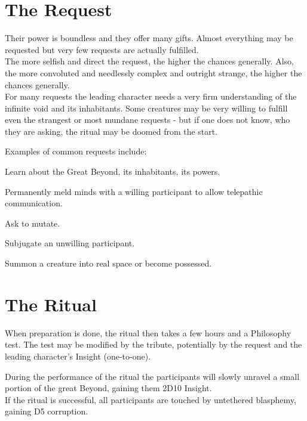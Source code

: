 \documentclass[12pt,a4paper,openany]{book}
\begin{document}
	\section{The Request}
	Their power is boundless and they offer many gifts. Almost everything may be requested but very few requests are actually fulfilled.
	\\
	The more selfish and direct the request, the higher the chances generally.
	Also, the more convoluted and needlessly complex and outright strange, the higher the chances generally.
	\\
	For many requests the leading character needs a very firm understanding of the infinite void and its inhabitants. 
	Some creatures may be very willing to fulfill even the strangest or most mundane requests
		- but if one does not know, who they are asking,
		the ritual may be doomed from the start.
	\par
	Examples of common requests include:
	\begin{sitemize}
		\item Learn about the Great Beyond, its inhabitants, its powers.
		\item Permanently meld minds with a willing participant to allow telepathic communication.
		\item Ask to mutate.
		\item Subjugate an unwilling participant.
		\item Summon a creature into real space or become possessed.
	\end{sitemize}
	\section{The Ritual}
	When preparation is done, the ritual then takes a few hours and a Philosophy test. The test may be modified by the tribute, potentially by the request and the leading character's Insight (one-to-one).
	\par
	During the performance of the ritual the participants will slowly unravel a small portion of the great Beyond, gaining them 2D10 Insight.\\
	If the ritual is successful, all participants are touched by untethered blasphemy, gaining D5 corruption.
\end{document}
